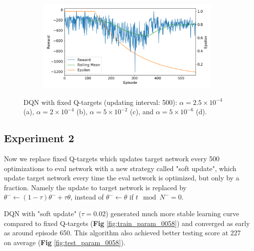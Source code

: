 \documentclass[10pt]{article}
\begin{document}
\begin{figure}[H]
\begin{subfigure}[b]{0.49\linewidth}
      \caption{}
  \label{fig:train_param_0082}
  \end{subfigure}
  \begin{subfigure}[b]{0.49\linewidth}
  \centering
  \includegraphics[width=\linewidth]{../logs/train_param_0083.png}
      \caption{}
  \label{fig:train_param_0083}
  \end{subfigure}
  \caption{DQN with fixed Q-targets (updating interval: 500): $\alpha=2.5\times 10^{-4}$ (a),  $\alpha=2\times 10^{-4}$ (b), $\alpha=5\times 10^{-2}$ (c), and $\alpha=5\times 10^{-6}$ (d).}
  \label{fig:param_0000}
\end{figure}


\subsection{Experiment 2} \label{experiment2}
Now we replace fixed Q-targets which updates target network every 500 optimizations to eval network with a new strategy called "soft update", which update target network every time the eval network is optimized, but only by a fraction. Namely the update to target network is replaced by $\theta^- \leftarrow (1-\tau)\theta^- + \tau\theta$, instead of $\theta^- \leftarrow \theta$ if $t\mod N^- = 0$.\cite{LillicrapContinuouscontroldeep2015}\par



DQN with "soft update" ($\tau=0.02$) generated much more stable learning curve compared to fixed Q-targets (\textbf{Fig} \ref{fig:train_param_0058}) and converged as early as around episode 650. This algorithm also achieved better testing score at 227 on average (\textbf{Fig} \ref{fig:test_param_0058}).
\end{document}
